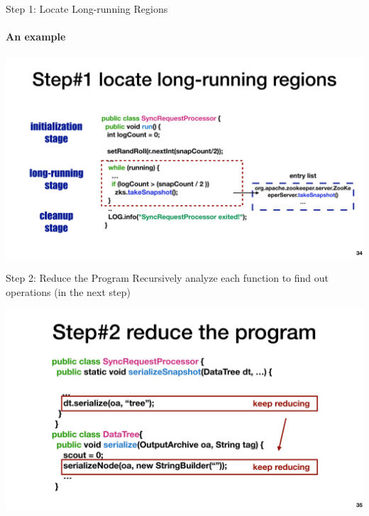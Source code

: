 \documentclass[aspectratio=169]{beamer}
\newcommand{\red}[1]{{\color{red}{#1}}}
\begin{document}
\begin{frame}{Step 1: Locate Long-running Regions}
\framesubtitle{An example}
    \begin{center}
        \includegraphics[width=.9\textwidth]{fig/long-run}
    \end{center}
\end{frame}

\begin{frame}{Step 2: Reduce the Program}
    Recursively analyze each function to find out \red{vulnerable} operations (in the next step)
    \begin{center}
        \includegraphics[width=.8\textwidth]{fig/rec-reduce}
    \end{center}
\end{frame}
\end{document}

